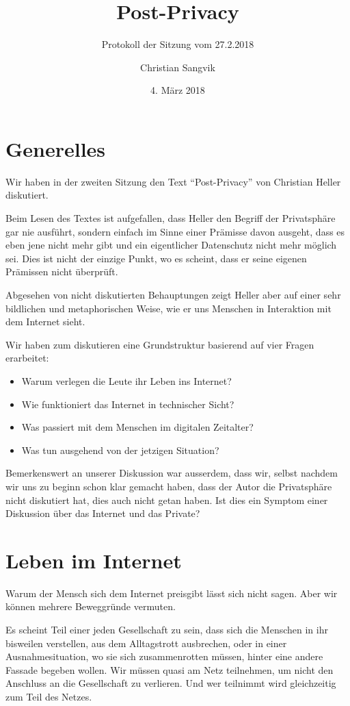 \documentclass[a4paper,ngerman,11pt]{scrartcl}
\subtitle{Protokoll der Sitzung vom 27.2.2018}
\author{Christian Sangvik}
\date{4. März 2018}
\title{Post-Privacy}
\begin{document}
\maketitle

\section{Generelles}
\label{sec-1}

Wir haben in der zweiten Sitzung den Text ``Post-Privacy'' von Christian Heller
diskutiert.\cite{Heller2011}

Beim Lesen des Textes ist aufgefallen, dass Heller den Begriff der
Privatsphäre gar nie ausführt, sondern einfach im Sinne einer Prämisse davon
ausgeht, dass es eben jene nicht mehr gibt und ein eigentlicher Datenschutz
nicht mehr möglich sei. Dies ist nicht der einzige Punkt,
wo es scheint, dass er seine eigenen Prämissen nicht überprüft.

Abgesehen von nicht diskutierten Behauptungen zeigt Heller aber auf einer sehr
bildlichen und metaphorischen Weise, wie er uns Menschen in Interaktion mit
dem Internet sieht.

Wir haben zum diskutieren eine Grundstruktur basierend auf vier Fragen
erarbeitet:

\begin{itemize}
\item Warum verlegen die Leute ihr Leben ins Internet?
\item Wie funktioniert das Internet in technischer Sicht?
\item Was passiert mit dem Menschen im digitalen Zeitalter?
\item Was tun ausgehend von der jetzigen Situation?
\end{itemize}

Bemerkenswert an unserer Diskussion war ausserdem, dass wir, selbst nachdem
wir uns zu beginn schon klar gemacht haben, dass der Autor die Privatsphäre
nicht diskutiert hat, dies auch nicht getan haben. Ist dies ein Symptom einer
Diskussion über das Internet und das Private?

\section{Leben im Internet}
\label{sec-2}

Warum der Mensch sich dem Internet preisgibt lässt sich nicht sagen. Aber wir
können mehrere Beweggründe vermuten.

Es scheint Teil einer jeden Gesellschaft zu sein, dass sich die Menschen in
ihr bisweilen verstellen, aus dem Alltagstrott ausbrechen, oder in einer
Ausnahmesituation, wo sie sich zusammenrotten müssen, hinter eine andere
Fassade begeben wollen. Wir müssen quasi am Netz teilnehmen, um nicht den
Anschluss an die Gesellschaft zu verlieren. Und wer teilnimmt wird
gleichzeitig zum Teil des Netzes.
\end{document}
